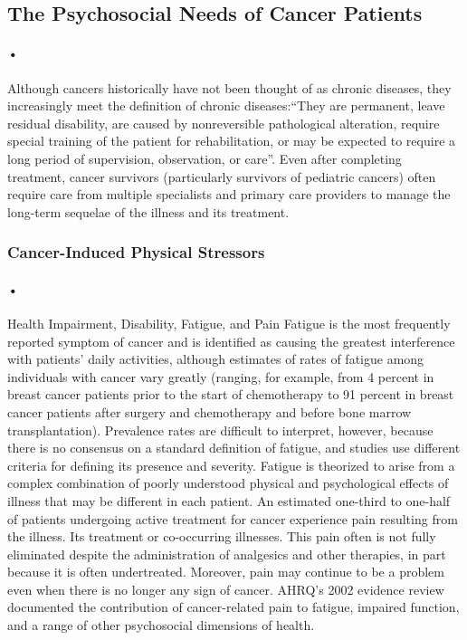 \documentclass[12pt]{article}
\begin{document}
\subsection{The Psychosocial Needs of Cancer Patients}
\paragraph{•}Although cancers historically have not been thought of as chronic diseases, they increasingly meet the definition of chronic diseases:“They are permanent, leave residual disability, are caused by nonreversible pathological alteration, require special training of the patient for rehabilitation, or may be expected to require a long period of supervision, observation, or care”\cite{Timmreck}. Even after completing treatment, cancer survivors (particularly survivors of pediatric cancers) often require care from multiple specialists and primary care providers to manage the long-term sequelae of the illness and its treatment.

\subsubsection{Cancer-Induced Physical Stressors}
\paragraph{•}Health Impairment, Disability, Fatigue, and Pain
Fatigue is the most frequently reported symptom of cancer and is identified as causing the greatest interference with patients’ daily activities, although estimates of rates of fatigue among individuals with cancer vary greatly (ranging, for example, from 4 percent in breast cancer patients prior to the start of chemotherapy to 91 percent in breast cancer patients after surgery and chemotherapy and before bone marrow transplantation). Prevalence rates are difficult to interpret, however, because there is no consensus on a standard definition of fatigue, and studies use different criteria for defining its presence and severity. Fatigue is theorized to arise from a complex combination of poorly understood physical and psychological effects of illness that may be different in each patient\cite{Carr}. An estimated one-third to one-half of patients undergoing active treatment for cancer experience pain resulting from the illness. Its treatment or co-occurring illnesses. This pain often is not fully eliminated despite the administration of analgesics and other therapies, in part because it is often undertreated. Moreover, pain may continue to be a problem even when there is no longer any sign of cancer. AHRQ’s 2002 evidence review documented the contribution of cancer-related pain to fatigue, impaired function, and a range of other psychosocial dimensions of health\cite{Carr}.
\end{document}
